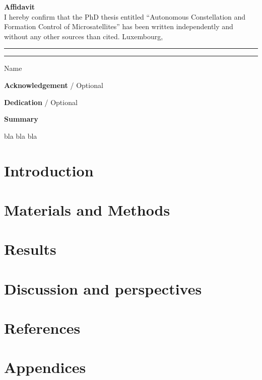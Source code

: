 \documentclass[11pt,a4paper]{report}
\begin{document}
\newpage

\noindent \textbf{\large{Affidavit}}\\
\newline
I hereby confirm that the PhD thesis entitled “Autonomous Constellation and Formation Control of Microsatellites” has been written independently and without any other sources than cited.
\vspace{2.5cm}
\newline
\noindent Luxembourg, \rule{4cm}{0.4pt}  \hspace{2cm} \rule{6cm}{0.4pt}
\newline 
\hspace*{9cm} Name


\newpage
\noindent \textbf{\large{Acknowledgement}} / Optional

 \newpage
\noindent \textbf{\large{Dedication}} / Optional 


\newpage
\renewcommand*\contentsname{Index}
\tableofcontents
\newpage
\listoffigures
\listoftables
\newpage
\begin{center}
\textbf{\large{Summary}}
\end{center}
bla bla bla
\newpage


\setcounter{page}{1}

\chapter{Introduction}


\chapter{Materials and Methods}


\chapter{Results}


\chapter{Discussion and perspectives}


\chapter*{References}
\printbibliography[heading=none]
\chapter*{Appendices}
\end{document}
